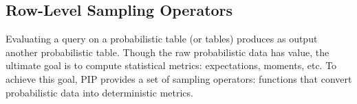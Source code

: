 %
%
%


\subsection{Row-Level Sampling Operators}
Evaluating a query on a probabilistic table (or tables) produces as output another probabilistic table.  Though the raw probabilistic data has value, the ultimate goal is to compute statistical metrics: expectations, moments, etc.  To achieve this goal, PIP provides a set of sampling operators: functions that convert probabilistic data into deterministic metrics.  

